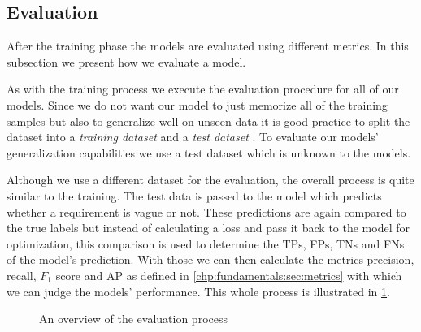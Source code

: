 \subsection{Evaluation}
\label{chp:study:sec:design:subsec:evaluation}
After the training phase the models are evaluated using different metrics.
In this subsection we present how we evaluate a model.

As with the training process we execute the evaluation procedure for all of our models.
Since we do not want our model to just memorize all of the training samples but also to generalize well on unseen data it is good practice to split the dataset into a \textit{training dataset} and a \textit{test dataset} \parencite{Reitermanova:2010}.
To evaluate our models' generalization capabilities we use a test dataset which is unknown to the models.

Although we use a different dataset for the evaluation, the overall process is quite similar to the training.
The test data is passed to the model which predicts whether a requirement is vague or not.
These predictions are again compared to the true labels but instead of calculating a loss and pass it back to the model for optimization, this comparison is used to determine the \acp{TP}, \acp{FP}, \acp{TN} and \acp{FN} of the model's prediction.
With those we can then calculate the metrics precision, recall, $F_1$ score and \ac{AP} as defined in \cref{chp:fundamentals:sec:metrics} with which we can judge the models' performance.
This whole process is illustrated in \cref{fig:study:design:evaluation}.

\newpage
\begin{figure}[htpb]
    \centering
    \def\svgwidth{\columnwidth}
    
    \caption[Study Design: Evaluation]{An overview of the evaluation process}\label{fig:study:design:evaluation}
\end{figure}

